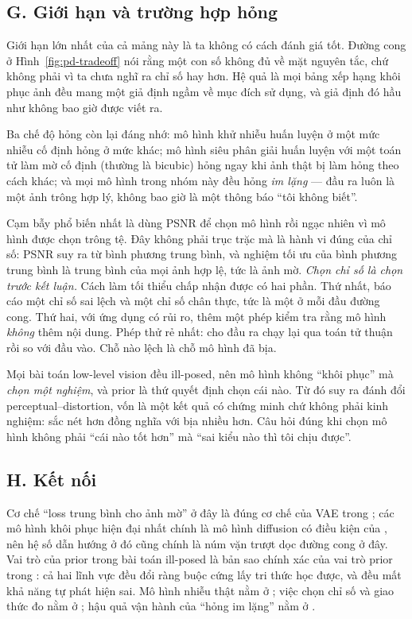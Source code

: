 \documentclass[../../../deep_learning.tex]{subfiles}
\begin{document}
\subsection{G. Giới hạn và trường hợp hỏng}
Giới hạn lớn nhất của cả mảng này là ta không có cách đánh giá tốt. Đường cong ở Hình~\ref{fig:pd-tradeoff} nói rằng một con số không đủ về mặt nguyên tắc, chứ không phải vì ta chưa nghĩ ra chỉ số hay hơn. Hệ quả là mọi bảng xếp hạng khôi phục ảnh đều mang một giả định ngầm về mục đích sử dụng, và giả định đó hầu như không bao giờ được viết ra.

Ba chế độ hỏng còn lại đáng nhớ: mô hình khử nhiễu huấn luyện ở một mức nhiễu cố định hỏng ở mức khác; mô hình siêu phân giải huấn luyện với một toán tử làm mờ cố định (thường là bicubic) hỏng ngay khi ảnh thật bị làm hỏng theo cách khác; và mọi mô hình trong nhóm này đều hỏng \emph{im lặng} --- đầu ra luôn là một ảnh trông hợp lý, không bao giờ là một thông báo ``tôi không biết''.

\begin{cambay}
Cạm bẫy phổ biến nhất là dùng PSNR để chọn mô hình rồi ngạc nhiên vì mô hình được chọn trông tệ. Đây không phải trục trặc mà là hành vi đúng của chỉ số: PSNR suy ra từ bình phương trung bình, và nghiệm tối ưu của bình phương trung bình là trung bình của mọi ảnh hợp lệ, tức là ảnh mờ. \emph{Chọn chỉ số là chọn trước kết luận.} Cách làm tối thiểu chấp nhận được có hai phần. Thứ nhất, báo cáo một chỉ số sai lệch và một chỉ số chân thực, tức là một ở mỗi đầu đường cong. Thứ hai, với ứng dụng có rủi ro, thêm một phép kiểm tra rằng mô hình \emph{không} thêm nội dung. Phép thử rẻ nhất: cho đầu ra chạy lại qua toán tử thuận rồi so với đầu vào. Chỗ nào lệch là chỗ mô hình đã bịa.
\end{cambay}

\begin{cannho}
Mọi bài toán low-level vision đều ill-posed, nên mô hình không ``khôi phục'' mà \emph{chọn một nghiệm}, và prior là thứ quyết định chọn cái nào. Từ đó suy ra đánh đổi perceptual--distortion, vốn là một kết quả có chứng minh chứ không phải kinh nghiệm: sắc nét hơn đồng nghĩa với bịa nhiều hơn. Câu hỏi đúng khi chọn mô hình không phải ``cái nào tốt hơn'' mà ``sai kiểu nào thì tôi chịu được''. 
\end{cannho}

\subsection{H. Kết nối}
Cơ chế ``loss trung bình cho ảnh mờ'' ở đây là đúng cơ chế của VAE trong ; các mô hình khôi phục hiện đại nhất chính là mô hình diffusion có điều kiện của , nên hệ số dẫn hướng ở đó cũng chính là núm vặn trượt dọc đường cong ở đây. Vai trò của prior trong bài toán ill-posed là bản sao chính xác của vai trò prior trong : cả hai lĩnh vực đều đổi ràng buộc cứng lấy tri thức học được, và đều mất khả năng tự phát hiện sai. Mô hình nhiễu thật nằm ở ; việc chọn chỉ số và giao thức đo nằm ở ; hậu quả vận hành của ``hỏng im lặng'' nằm ở .
\end{document}
